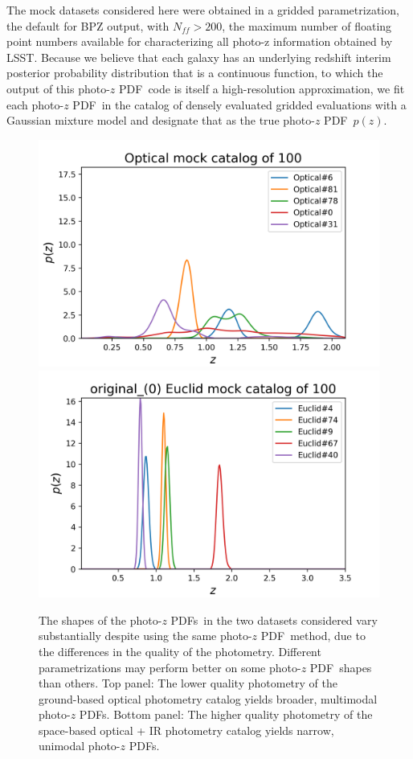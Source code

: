 \documentclass[\docopts]{\docclass}
\newcommand{\pz}{photo-$z$ PDF}
\begin{document}
The mock datasets considered here were obtained in a gridded parametrization, 
the default for BPZ output, with $N_{ff}>200$, the maximum number of floating 
point numbers available for characterizing all photo-z information obtained by 
LSST.  \citep{juric_data_2017}  Because we believe that each galaxy has an 
underlying redshift interim posterior probability distribution that is a 
continuous function, to which the output of this \pz\ code is itself a 
high-resolution approximation, we fit each \pz\ in the catalog of densely 
evaluated gridded evaluations with a Gaussian mixture model and designate that 
as the true \pz\ $p(z)$.

\begin{figure}
  \includegraphics[width=0.9\columnwidth]{figures/lsst_pzs.png}\\
  \includegraphics[width=0.9\columnwidth]{figures/euclid_pzs.png}
  \caption{The shapes of the \pz s\ in the two datasets considered vary 
substantially despite using the same \pz\ method, due to the differences in the 
quality of the photometry.  Different parametrizations may perform better on 
some \pz\ shapes than others.  Top panel: The lower quality photometry of the 
ground-based optical photometry catalog yields broader, multimodal \pz s. 
Bottom panel: The higher quality photometry of the space-based optical + IR 
photometry catalog yields narrow, unimodal \pz s.
  \label{fig:pzs}}
\end{figure}
\end{document}
